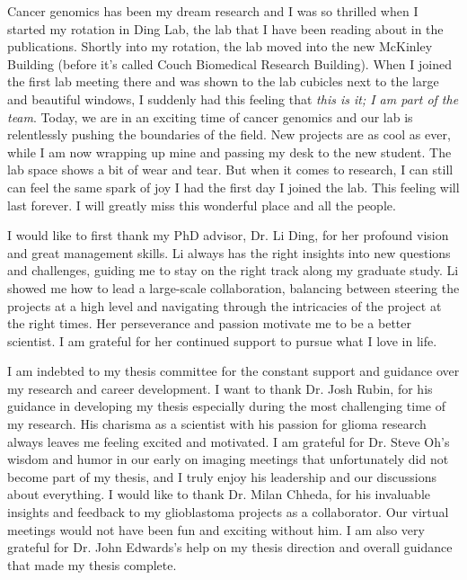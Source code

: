 \thesisacknowledgments

Cancer genomics has been my dream research and I was so thrilled when I started my rotation in Ding Lab, the lab that I have been reading about in the publications.
Shortly into my rotation, the lab moved into the new McKinley Building (before it's called Couch Biomedical Research Building).
When I joined the first lab meeting there and was shown to the lab cubicles next to the large and beautiful windows, I suddenly had this feeling that \textit{this is it; I am part of the team}.
Today, we are in an exciting time of cancer genomics and our lab is relentlessly pushing the boundaries of the field.
New projects are as cool as ever, while I am now wrapping up mine and passing my desk to the new student.
The lab space shows a bit of wear and tear.
But when it comes to research, I can still can feel the same spark of joy I had the first day I joined the lab.
This feeling will last forever.
I will greatly miss this wonderful place and all the people.

I would like to first thank my PhD advisor, Dr. Li Ding, for her profound vision and great management skills.
Li always has the right insights into new questions and challenges, guiding me to stay on the right track along my graduate study.
Li showed me how to lead a large-scale collaboration, balancing between steering the projects at a high level and navigating through the intricacies of the project at the right times.
Her perseverance and passion motivate me to be a better scientist.
I am grateful for her continued support to pursue what I love in life.

I am indebted to my thesis committee for the constant support and guidance over my research and career development.
I want to thank Dr. Josh Rubin, for his guidance in developing my thesis especially during the most challenging time of my research.
His charisma as a scientist with his passion for glioma research always leaves me feeling excited and motivated.
I am grateful for Dr. Steve Oh's wisdom and humor in our early on imaging meetings that unfortunately did not become part of my thesis, and I truly enjoy his leadership and our discussions about everything.
I would like to thank Dr. Milan Chheda, for his invaluable insights and feedback to my glioblastoma projects as a collaborator. Our virtual meetings would not have been fun and exciting without him. I am also very grateful for Dr. John Edwards's help on my thesis direction and overall guidance that made my thesis complete.

